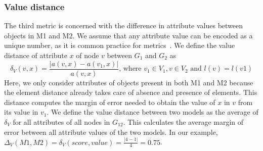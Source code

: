 \subsubsection{Value distance}
The third metric is concerned with the difference in attribute values between objects in M1 and M2.
We assume that any attribute value can be encoded as a unique number, as it is common practice for metrics~\cite{Bertoa2018}.
We define the value distance of attribute $x$ of node $v$ between $G_1$ and $G_2$ as
\[
\delta_V(v,x)=\frac{|a(v,x)-a(v_1,x)|}{a(v,x)} \mbox{, where } v_1 \in V_1, v \in V_2 \mbox{ and } l(v)=l(v1)
\]
Here, we only consider attributes of objects present in both M1 and M2 because the element distance already takes care of absence and presence of elements.
This distance computes the margin of error needed to obtain the value of $x$ in $v$ from its value in $v_1$.
We define the value distance between two models as the average of $\delta_V$ for all attributes of all nodes in $G_{12}$.
This calculates the average margin of error between all attribute values of the two models.
In our example, $\Delta_V(M1,M2)=\delta_V(score,value)=\frac{|4-1|}{4}=0.75$.

